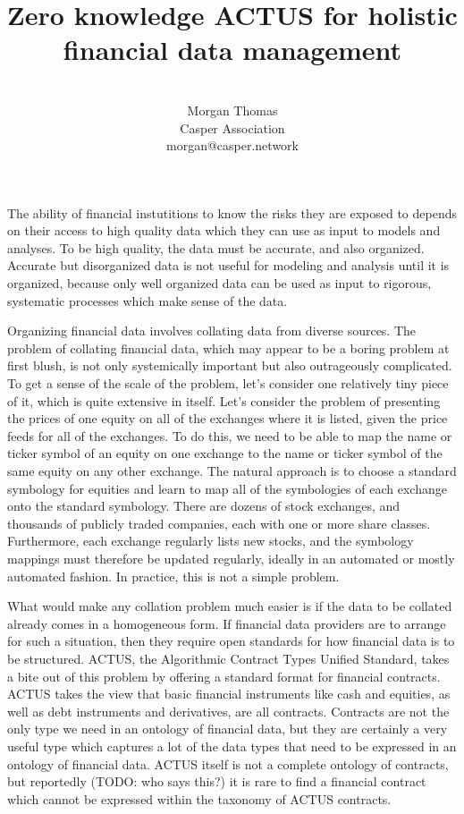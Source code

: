 \documentclass[11pt]{article}
\title{Zero knowledge ACTUS for holistic financial data management}
\author{ \\ Morgan Thomas \\ Casper Association \\ morgan@casper.network }
\begin{document}
\maketitle

The ability of financial instutitions to know the risks they are exposed to
depends on their access to high quality data which they can use as input to
models and analyses. To be high quality, the data must be accurate, and also
organized. Accurate but disorganized data is not useful for modeling and analysis
until it is organized, because only well organized data can be used as input to
rigorous, systematic processes which make sense of the data.

Organizing financial data involves collating data from diverse sources.
The problem of collating financial data, which may appear to be a boring problem
at first blush, is not only systemically important but also outrageously
complicated. To get a sense of the scale of the problem, let's consider one
relatively tiny piece of it, which is quite extensive in itself. Let's consider
the problem of presenting the prices of one equity on all of the exchanges
where it is listed, given the price feeds for all of the exchanges. To do this,
we need to be able to map the name or ticker symbol of an equity on one exchange
to the name or ticker symbol of the same equity on any other exchange. The natural
approach is to choose a standard symbology for equities and learn to map all of
the symbologies of each exchange onto the standard symbology. There are dozens
of stock exchanges, and thousands of publicly traded companies, each with one
or more share classes. Furthermore, each exchange regularly lists new stocks, and
the symbology mappings must therefore be updated regularly, ideally in an automated
or mostly automated fashion. In practice, this is not a simple problem.

What would make any collation problem much easier is if the data to be collated
already comes in a homogeneous form. If financial data providers are to arrange
for such a situation, then they require open standards for how financial data is to
be structured.
ACTUS, the Algorithmic Contract Types Unified Standard, takes a bite out of this
problem by offering a standard format for financial contracts. ACTUS takes the
view that basic financial instruments like cash and equities, as well as
debt instruments and derivatives, are all contracts. Contracts are not the only
type we need in an ontology of financial data, but they are certainly a very
useful type which captures a lot of the data types that need to be expressed
in an ontology of financial data. ACTUS itself is not a complete ontology of
contracts, but reportedly (TODO: who says this?) it is rare to find a financial
contract which cannot be expressed within the taxonomy of ACTUS contracts.
\end{document}
